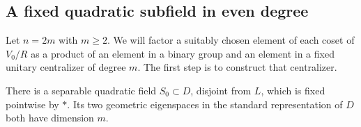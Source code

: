 \subsection{A fixed quadratic subfield in even degree}

Let $n=2m$ with $m\geq2$.  We will factor a suitably chosen element of
each coset of $V_0/R$ as a product of an element in a binary group and an
element in a fixed unitary centralizer of degree $m$.  The first step is
to construct that centralizer.

\begin{lemma}\label{ind:fixed-field}
There is a separable quadratic field $S_0\subset D$, disjoint from $L$,
which is fixed pointwise by $*$.  Its two geometric eigenspaces in the
standard representation of $D$ both have dimension $m$.
\end{lemma}

